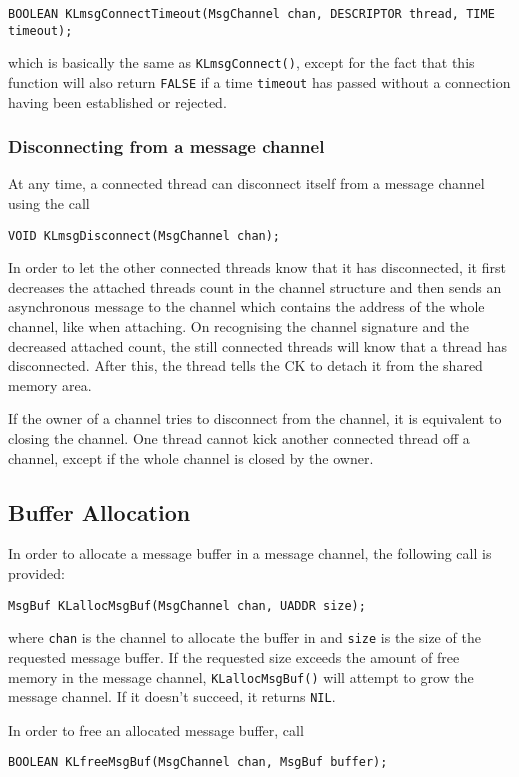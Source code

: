 \documentclass[]{article}
\begin{document}
{\parindent0.6cm\tt BOOLEAN KLmsgConnectTimeout(MsgChannel chan, DESCRIPTOR thread, TIME timeout);}

which is basically the same as {\tt KLmsgConnect()}, except for the fact
that this function will also return {\tt FALSE} if a time {\tt timeout}
has passed without a connection having been established or rejected.

\subsubsection{Disconnecting from a message channel}

At any time, a connected thread can disconnect itself from a message
channel using the call

{\parindent0.6cm\tt VOID KLmsgDisconnect(MsgChannel chan);}

In order to let the other connected threads know that it has disconnected,
it first decreases the attached threads count in the channel structure and
then sends an asynchronous message to the channel which contains the
address of the whole channel, like when attaching.  On recognising the
channel signature and the decreased attached count, the still connected
threads will know that a thread has disconnected.  After this, the thread
tells the CK to detach it from the shared memory area.

If the owner of a channel tries to disconnect from the channel, it is
equivalent to closing the channel. One thread cannot kick another
connected thread off a channel, except if the whole channel is closed by
the owner.

\subsection{Buffer Allocation}

In order to allocate a message buffer in a message channel, the following
call is provided:

{\parindent0.6cm\tt MsgBuf KLallocMsgBuf(MsgChannel chan, UADDR size);}

where {\tt chan} is the channel to allocate the buffer in and {\tt size}
is the size of the requested message buffer.  If the requested size
exceeds the amount of free memory in the message channel,
{\tt KLallocMsgBuf()} will attempt to grow the message channel.  If it
doesn't succeed, it returns {\tt NIL}.

In order to free an allocated message buffer, call

{\parindent0.6cm\tt BOOLEAN KLfreeMsgBuf(MsgChannel chan, MsgBuf buffer);}
\end{document}
